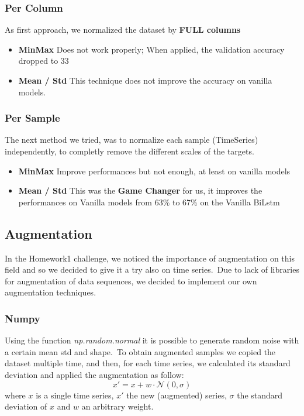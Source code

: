 \documentclass[11pt]{article}
\begin{document}
\subsubsection{Per Column}
As first approach, we normalized the dataset by \textbf{FULL columns}
\begin{itemize}
  \item \textbf{MinMax} Does not work properly; When applied, the validation accuracy dropped to 33%
  \item \textbf{Mean / Std} This technique does not improve the accuracy on vanilla models.
\end{itemize}
\subsubsection{Per Sample}
The next method we tried, was to normalize each sample (TimeSeries) independently, to completly remove the different scales of the targets.
\begin{itemize}
  \item \textbf{MinMax} Improve performances but not enough, at least on vanilla models
  \item \textbf{Mean / Std} This was the \textbf{Game Changer} for us, it improves the performances on Vanilla models from 63\% to 67\% on the Vanilla BiLstm
\end{itemize}
\subsection{Augmentation}
In the Homework1 challenge, we noticed the importance of augmentation on this field and so we decided to give it a try also on time series.\
Due to lack of libraries for augmentation of data sequences, we decided to implement our own augmentation techniques.

\subsubsection{Numpy}
Using the function \textit{np.random.normal} it is possible to generate random noise with a certain mean std and shape.\
To obtain augmented samples we copied the dataset multiple time, and then, for each time series, we calculated its standard deviation and applied the augmentation as follow:
\begin{equation*}
    x' = x + w\cdot\mathcal{N}(0, \sigma)
\end{equation*}
where $x$ is a single time series, $x'$ the new (augmented) series, $\sigma$ the standard deviation of $x$ and $w$ an arbitrary weight.
\end{document}
